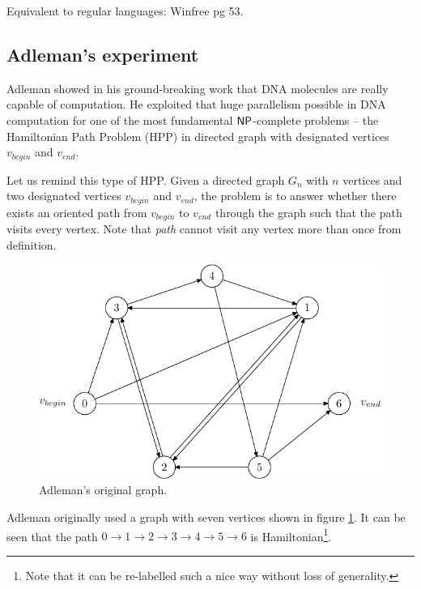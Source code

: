 		Equivalent to regular languages: Winfree pg 53.
	
	\subsection{Adleman's experiment}
	\label{sec:adleman}
		
		Adleman showed in his ground-breaking work \cite{adleman94} that DNA molecules are really capable of computation. He exploited that huge parallelism possible in DNA computation for one of the most fundamental $\mathsf{NP}$-complete problems -- the Hamiltonian Path Problem (HPP) in directed graph with designated vertices $v_{begin}$ and $v_{end}$.
		
		Let us remind this type of HPP. Given a directed graph $G_n$ with $n$ vertices and two designated vertices $v_{begin}$ and $v_{end}$, the problem is to answer whether there exists an oriented path from $v_{begin}$ to $v_{end}$ through the graph such that the path visits every vertex. Note that {\em path} cannot visit any vertex more than once from definition.
		
		\begin{figure}[H]
		\begin{center}
			\includegraphics{./figures/adleman_graph.pdf}
			\caption{Adleman's original graph.}
			\label{fig:adleman_graph}
		\end{center}
		\end{figure}
		
		Adleman originally used a graph with seven vertices shown in figure \ref{fig:adleman_graph}. It can be seen that the path $0 \rightarrow 1 \rightarrow 2 \rightarrow 3 \rightarrow 4 \rightarrow 5 \rightarrow 6$ is Hamiltonian\footnote{Note that it can be re-labelled such a nice way without loss of generality.}.
		
